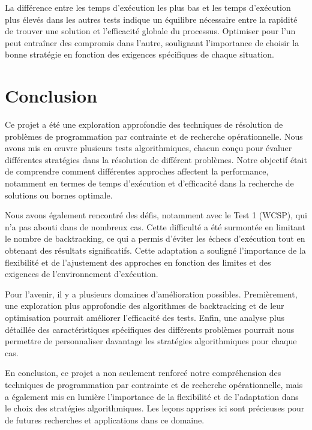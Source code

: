 \documentclass[a4paper, 10pt]{article}
\begin{document}
       La différence entre les temps d'exécution les plus bas et les temps d'exécution plus élevés dans les autres tests indique un équilibre nécessaire entre la rapidité de trouver une solution et l'efficacité globale du processus. Optimiser pour l'un peut entraîner des compromis dans l'autre, soulignant l'importance de choisir la bonne stratégie en fonction des exigences spécifiques de chaque situation.
       

\section{Conclusion}

Ce projet a été une exploration approfondie des techniques de résolution de problèmes de programmation par contrainte et de recherche opérationnelle. Nous avons mis en œuvre plusieurs tests algorithmiques, chacun conçu pour évaluer différentes stratégies dans la résolution de différent problèmes. Notre objectif était de comprendre comment différentes approches affectent la performance, notamment en termes de temps d'exécution et d'efficacité dans la recherche de solutions ou bornes optimale.

Nous avons également rencontré des défis, notamment avec le Test 1 (WCSP), qui n'a pas abouti dans de nombreux cas. Cette difficulté a été surmontée en limitant le nombre de backtracking, ce qui a permis d'éviter les échecs d'exécution tout en obtenant des résultats significatifs. Cette adaptation a souligné l'importance de la flexibilité et de l'ajustement des approches en fonction des limites et des exigences de l'environnement d'exécution.

Pour l'avenir, il y a plusieurs domaines d'amélioration possibles. Premièrement, une exploration plus approfondie des algorithmes de backtracking et de leur optimisation pourrait améliorer l'efficacité des tests. Enfin, une analyse plus détaillée des caractéristiques spécifiques des différents problèmes pourrait nous permettre de personnaliser davantage les stratégies algorithmiques pour chaque cas.

En conclusion, ce projet a non seulement renforcé notre compréhension des techniques de programmation par contrainte et de recherche opérationnelle, mais a également mis en lumière l'importance de la flexibilité et de l'adaptation dans le choix des stratégies algorithmiques. Les leçons apprises ici sont précieuses pour de futures recherches et applications dans ce domaine.
\end{document}
